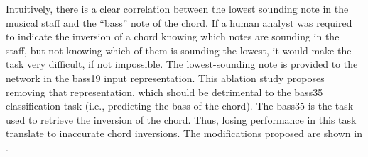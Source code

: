 
Intuitively, there is a clear correlation between the lowest
sounding note in the musical staff and the ``bass'' note of
the chord. If a human analyst was required to indicate the
inversion of a chord knowing which notes are sounding in the
staff, but not knowing which of them is sounding the lowest,
it would make the task very difficult, if not impossible.
The lowest-sounding note is provided to the network in the
\gls{bass19} input representation. This ablation study
proposes removing that representation, which should be
detrimental to the \gls{bass35} classification task (i.e.,
predicting the bass of the chord). The \gls{bass35} is the
task used to retrieve the inversion of the chord. Thus,
losing performance in this task translate to inaccurate
chord inversions. The modifications proposed are shown in
.

